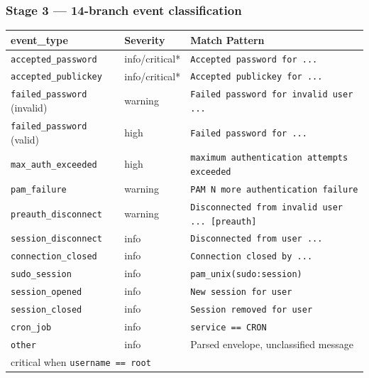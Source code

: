 \documentclass[12pt,a4paper]{article}
\begin{document}
\subsubsection*{Stage 3 — 14-branch event classification}

\begin{center}
\begin{tabular}{p{4.5cm}p{2cm}p{6.5cm}}
  \toprule
  \textbf{event\_type} & \textbf{Severity} & \textbf{Match Pattern} \\
  \midrule
  \texttt{accepted\_password}    & info/critical* & \texttt{Accepted password for ...} \\
  \texttt{accepted\_publickey}   & info/critical* & \texttt{Accepted publickey for ...} \\
  \texttt{failed\_password} (invalid) & warning  & \texttt{Failed password for invalid user ...} \\
  \texttt{failed\_password} (valid)   & high     & \texttt{Failed password for ...} \\
  \texttt{max\_auth\_exceeded}   & high           & \texttt{maximum authentication attempts exceeded} \\
  \texttt{pam\_failure}          & warning        & \texttt{PAM N more authentication failure} \\
  \texttt{preauth\_disconnect}   & warning        & \texttt{Disconnected from invalid user ... [preauth]} \\
  \texttt{session\_disconnect}   & info           & \texttt{Disconnected from user ...} \\
  \texttt{connection\_closed}    & info           & \texttt{Connection closed by ...} \\
  \texttt{sudo\_session}         & info           & \texttt{pam\_unix(sudo:session)} \\
  \texttt{session\_opened}       & info           & \texttt{New session for user} \\
  \texttt{session\_closed}       & info           & \texttt{Session removed for user} \\
  \texttt{cron\_job}             & info           & \texttt{service == CRON} \\
  \texttt{other}                 & info           & Parsed envelope, unclassified message \\
  \bottomrule
  \multicolumn{3}{l}{\small *critical when \texttt{username == root}}
\end{tabular}
\end{center}
\end{document}
